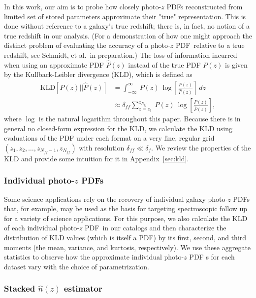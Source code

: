 \documentclass[\docopts]{\docclass}
\newcommand{\pz}{photo-$z$ PDF}
\begin{document}
In this work, our aim is to probe how closely \pz s reconstructed from limited 
set of stored parameters approximate their "true" representation.
This is done without reference to a galaxy's true redshift; there is, in fact, 
no notion of a true redshift in our analysis.
(For a demonstration of how one might approach the distinct problem of 
evaluating the accuracy of a \pz\ relative to a true redshift, see Schmidt, et 
al.\ in preparation.)
The loss of information incurred when using an approximate PDF $\hat{P}(z)$ 
instead of the true PDF $P(z)$ is given by the Kullback-Leibler divergence 
(KLD), which is defined as
\begin{align}
  \label{eq:kld}
  \mathrm{KLD}[P(z) || \hat{P}(z)] &= \int_{-\infty}^{\infty}\ P(z)\ 
\log\left[\frac{P(z)}{\hat{P}(z)}\right]\ dz\\
  &\approx \delta_{ff}\sum_{z=z_{1}}^{z_{N_{ff}}}\ P(z)\ 
\log\left[\frac{P(z)}{\hat{P}(z)}\right],
\end{align}
where $\log$ is the natural logarithm throughout this paper.
Because there is in general no closed-form expression for the KLD, we calculate 
the KLD using evaluations of the PDF under each format on a very fine, regular 
grid $(z_{1}, z_{2}, \dots, z_{N_{ff}-1}, z_{N_{ff}})$ with resolution 
$\delta_{ff}\ll\delta_{f}$.
We review the properties of the KLD and provide some intuition for it in 
Appendix~\ref{sec:kld}.

\subsubsection{Individual \pz s}
\label{sec:individual_metric}

Some science applications rely on the recovery of individual galaxy \pz s that, 
for example, may be used as the basis for targeting spectroscopic follow up for 
a variety of science applications.
For this purpose, we also calculate the KLD of each individual \pz\ in our 
catalogs and then characterize the distribution of KLD values (which is itself 
a PDF) by its first, second, and third moments (the mean, variance, and 
kurtosis, respectively).
We use these aggregate statistics to observe how the approximate individual \pz 
s for each dataset vary with the choice of parametrization.

\subsubsection{Stacked $\hat{n}(z)$ estimator}
\label{sec:stacked_metric}
\end{document}
